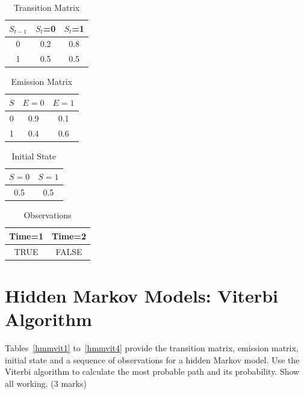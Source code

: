 \documentclass{article}
\begin{document}
\begin{table}[h!]
\caption{Transition Matrix}
\label{hmmfb1}
\begin{center}
\begin{tabular}{ |c||c|c| } 
\hline
 $S_{t-1}$ & $S_t$=0 & $S_t$=1\\
\hline
 0 & 0.2 & 0.8\\
 1 & 0.5 & 0.5\\
\hline
\end{tabular}
\end{center}
\end{table}
\begin{table}[h!]
\caption{Emission Matrix}
\label{hmmfb2}
\begin{center}
\begin{tabular}{ |c||c|c| } 
\hline
 $S$ & $E=0$ & $E=1$\\
\hline
 0 & 0.9 & 0.1\\
 1 & 0.4 & 0.6\\
\hline
\end{tabular}
\end{center}
\end{table}
\begin{table}[h!]
\caption{Initial State}
\label{hmmfb3}
\begin{center}
\begin{tabular}{ |c|c| } 
\hline
 $S=0$ & $S=1$\\
\hline
0.5 & 0.5\\
\hline
\end{tabular}
\end{center}
\end{table}
\begin{table}[h!]
\caption{Observations}
\label{hmmfb4}
\begin{center}
\begin{tabular}{ |c|c| } 
\hline
 Time=1 & Time=2\\
\hline
TRUE & FALSE\\
\hline
\end{tabular}
\end{center}
\end{table}
\clearpage
\section{Hidden Markov Models: Viterbi Algorithm}

Tables~\ref{hmmvit1} to~\ref{hmmvit4} provide the transition matrix, emission matrix, initial state and a sequence of observations for a hidden Markov model. Use the Viterbi algorithm to calculate the most probable path and its probability. Show all working. (3 marks)
\end{document}
